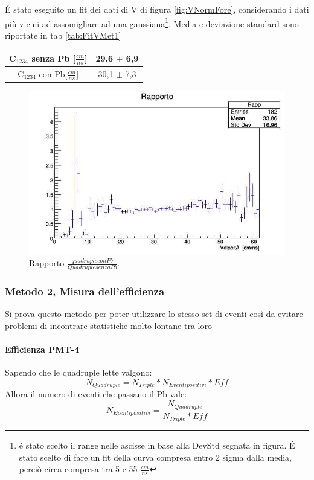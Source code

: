 \documentclass[a4paper]{article}
\begin{document}
\'E stato eseguito un fit dei dati di V di figura \ref{fig:VNormFore}, considerando i dati più vicini ad assomigliare ad una gaussiana\footnote{é stato scelto il range nelle ascisse in base alla DevStd segnata in figura. \'E stato scelto di fare un fit della curva compresa entro 2 sigma dalla media, perciò circa compresa tra 5 e 55 $\frac{cm}{ns}$}. Media e deviazione standard sono riportate in tab \ref{tab:FitVMet1}

\begin{tabular}{c|c}
C$_{1234}$ senza Pb [$\frac{cm}{ns}$] & 29,6 $\pm$ 6,9 \\
\hline
C$_{1234}$ con Pb[$\frac{cm}{ns}$] & 30,1 $\pm$ 7,3
\label{tab:FitVMet1}
\end{tabular}

\begin{figure}[H]
\centering
\includegraphics[scale=0.3]{./immagini/TimeOfFlight/VRappFore.jpg}
\caption{Rapporto $\frac{quadruple con Pb}{Quadruple senza Pb}$.}
\label{fig:VRappFore}
\end{figure}

\subsubsection*{Metodo 2, Misura dell'efficienza}
\label{sec:Met2}
Si prova questo metodo per poter utilizzare lo stesso set di eventi così da evitare problemi di incontrare statistiche molto lontane tra loro

\paragraph{Efficienza PMT-4}
Sapendo che le quadruple lette valgono:
\begin{equation}
N_{Quadruple} = N_{Triple} * N_{Eventi positivi} * Eff
\end{equation}
Allora il numero di eventi che passano il Pb vale:
\begin{equation}
N_{Eventi positivi} = \frac{N_{Quadruple}}{N_{Triple}*Eff}
\label{eq:VRappMet2}
\end{equation}
\end{document}
